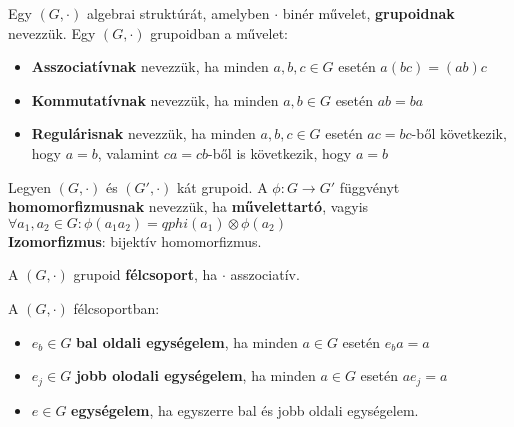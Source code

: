 \begin{frame}
  \begin{tcolorbox}[title={Def.: Grupoid}]
    Egy $(G, {\cdot})$ algebrai struktúrát, amelyben $\cdot$ binér művelet, \textbf{grupoidnak} nevezzük.
  \tcblower
    Egy $(G, {\cdot})$ grupoidban a művelet:\\

    \begin{itemize}
      \item \textbf{Asszociatívnak} nevezzük, ha minden $a, b, c \in G$ esetén $a(bc) = (ab)c$
      \item \textbf{Kommutatívnak} nevezzük, ha minden $a, b \in G$ esetén $ab = ba$
      \item \textbf{Regulárisnak} nevezzük, ha minden $a, b, c \in G$ esetén $ac = bc$-ből következik, hogy $a = b$, valamint $ca = cb$-ből is következik, hogy $a = b$
    \end{itemize}
  \end{tcolorbox}

  \begin{tcolorbox}[title={Def.: Morfizmusok}]
    Legyen $(G, {\cdot})$ és $(G', {\cdot})$ kát grupoid. A ${\phi} : G \rightarrow G'$ függvényt \textbf{homomorfizmusnak} nevezzük, ha \textbf{művelettartó}, vagyis ${\forall}a_1, a_2 \in G : {\phi}(a_1a_2) = {qphi}(a_1) \otimes {\phi}(a_2)$\\

    \textbf{Izomorfizmus}: bijektív homomorfizmus.
  \end{tcolorbox}

  \begin{tcolorbox}[title={Def.: Félcsoport}]
    A $(G, {\cdot})$ grupoid \textbf{félcsoport}, ha $\cdot$ asszociatív.
  \end{tcolorbox}

  \begin{tcolorbox}[title={Def.: Baloldali, Jobboldali egységelem, Egységelem}]
    A $(G, {\cdot})$  félcsoportban:\\
    \begin{itemize}
      \item $e_b \in G$ \textbf{bal oldali egységelem}, ha minden $a \in G$ esetén $e_ba = a$
      \item $e_j \in G$ \textbf{jobb olodali egységelem}, ha minden $a \in G$ esetén $ae_j = a$
      \item $e \in G$ \textbf{egységelem}, ha egyszerre bal és jobb oldali egységelem.
    \end{itemize}
  \end{tcolorbox}
\end{frame}

